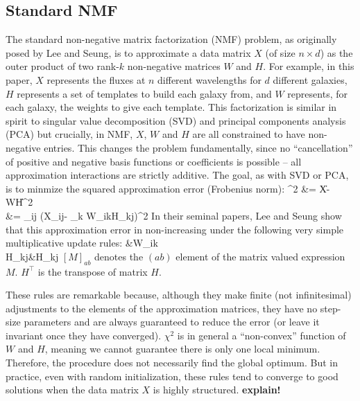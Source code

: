 \documentclass[10pt,preprint]{aastex}
\def\beqa#1\eeqa{\begin{align}#1\end{align}}
\newcommand{\T}{^{\scriptscriptstyle \top}}
\newcommand{\XX}{X}
\newcommand{\XXh}{\hat{X}}
\newcommand{\Xij}{X_{ij}}
\newcommand{\WW}{W}
\newcommand{\Wik}{W_{ik}}
\newcommand{\HH}{H}
\newcommand{\Hkj}{H_{kj}}
\begin{document}
\subsection{Standard NMF}
The standard non-negative matrix factorization (NMF) problem, as
originally posed by Lee and Seung\cite{??}, is to approximate a data
matrix $\XX$ (of size $n\times d$) as the outer product of two
rank-$k$ non-negative matrices $\WW$ and $\HH$. For example, in this
paper, $\XX$ represents the fluxes at $n$ different wavelengths for
$d$ different galaxies, $\HH$ represents a set of templates to build
each galaxy from, and $\WW$ represents, for each galaxy, the weights
to give each template. This factorization is similar in spirit to
singular value decomposition (SVD) and principal components analysis
(PCA) but crucially, in NMF, $\XX$, $\WW$ and $\HH$ are all
constrained to have non-negative entries. This changes the problem
fundamentally, since no ``cancellation'' of positive and negative
basis functions or coefficients is possible -- all approximation
interactions are strictly additive. The goal, as with SVD or PCA, is
to minmize the squared approximation error (Frobenius norm):
\beqa
\chi^2 &= \|\XX-\WW\HH\|^2\\
&= \sum_{ij} \left(\Xij - \sum_k \Wik\Hkj \right)^2
\eeqa
In their seminal papers\cite{??}, Lee and Seung show that this approximation
error in non-increasing under the following very simple multiplicative
update rules: 
\beqa
\Wik &\leftarrow \Wik \frac{[\XX\HH\T]_{ik}}{[\WW\HH\HH\T]_{ik}}\\
\Hkj &\leftarrow \Hkj \frac{[\WW\T\XX]_{kj}}{[\WW\T\WW\HH]_{kj}}
\eeqa
$[M]_{ab}$ denotes the $(ab)$ element of the matrix valued expression
$M$. $\HH\T$ is the transpose of matrix $\HH$.

These rules are remarkable because, although they make finite (not
infinitesimal) adjustments to the elements of the approximation
matrices, they have no step-size parameters and are always guaranteed
to reduce the error (or leave it invariant once they have converged).
$\chi^2$ is in general a ``non-convex'' function of $\WW$ and $\HH$,
meaning we cannot guarantee there is only one local
minimum. Therefore, the procedure does not necessarily find the global
optimum. But in practice, even with random initialization, these rules
tend to converge to good solutions when the data matrix $\XX$ is
highly structured. {\bf explain!}
\end{document}
